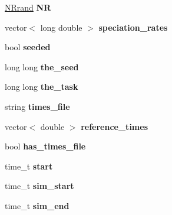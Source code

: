 \begin{DoxyCompactItemize}
\item 
\hyperlink{class_n_rrand}{N\+Rrand} {\bfseries NR}\hypertarget{class_tree_aa7df162306777b040a9a2aac543e6801}{}\label{class_tree_aa7df162306777b040a9a2aac543e6801}

\item 
vector$<$ long double $>$ {\bfseries speciation\+\_\+rates}\hypertarget{class_tree_a61b4349fe78d09ac06eff4b7d6833105}{}\label{class_tree_a61b4349fe78d09ac06eff4b7d6833105}

\item 
bool {\bfseries seeded}\hypertarget{class_tree_a78935befd45946b8e69023bffca59c1d}{}\label{class_tree_a78935befd45946b8e69023bffca59c1d}

\item 
long long {\bfseries the\+\_\+seed}\hypertarget{class_tree_acf483ed0a44629c9aa4690a08017ee35}{}\label{class_tree_acf483ed0a44629c9aa4690a08017ee35}

\item 
long long {\bfseries the\+\_\+task}\hypertarget{class_tree_a9f74137d5c9c5529ec9a06f88dfa6960}{}\label{class_tree_a9f74137d5c9c5529ec9a06f88dfa6960}

\item 
string {\bfseries times\+\_\+file}\hypertarget{class_tree_a5e031ea8d94f48288547116a9e7d7add}{}\label{class_tree_a5e031ea8d94f48288547116a9e7d7add}

\item 
vector$<$ double $>$ {\bfseries reference\+\_\+times}\hypertarget{class_tree_a56bb1ea64368f5b705360a435350f9d5}{}\label{class_tree_a56bb1ea64368f5b705360a435350f9d5}

\item 
bool {\bfseries has\+\_\+times\+\_\+file}\hypertarget{class_tree_adf239a9aa029c9c6eda4b10c5ce20780}{}\label{class_tree_adf239a9aa029c9c6eda4b10c5ce20780}

\item 
time\+\_\+t {\bfseries start}\hypertarget{class_tree_ac077d686ee96b123aa779e8a8a5de3ce}{}\label{class_tree_ac077d686ee96b123aa779e8a8a5de3ce}

\item 
time\+\_\+t {\bfseries sim\+\_\+start}\hypertarget{class_tree_a01cc9b30f2b10b9f51b218df25b13b09}{}\label{class_tree_a01cc9b30f2b10b9f51b218df25b13b09}

\item 
time\+\_\+t {\bfseries sim\+\_\+end}\hypertarget{class_tree_a26100477c7e58a9e0a90cdee1379ed69}{}\label{class_tree_a26100477c7e58a9e0a90cdee1379ed69}


\end{DoxyCompactItemize}
